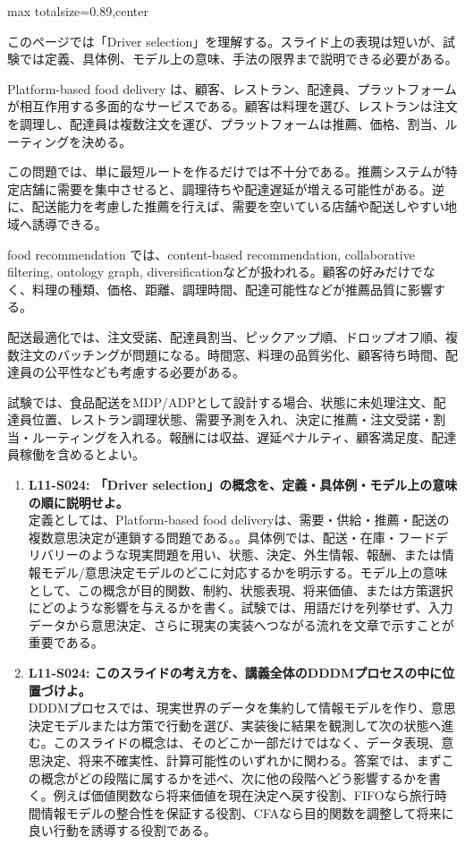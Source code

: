 \begin{minipage}[t]{0.58\textwidth}
\begin{adjustbox}{max totalsize={\textwidth}{0.89\textheight},center}
\begin{minipage}{\textwidth}\scriptsize
{}このページでは「Driver selection」を理解する。スライド上の表現は短いが、試験では定義、具体例、モデル上の意味、手法の限界まで説明できる必要がある。\par
Platform-based food delivery は、顧客、レストラン、配達員、プラットフォームが相互作用する多面的なサービスである。顧客は料理を選び、レストランは注文を調理し、配達員は複数注文を運び、プラットフォームは推薦、価格、割当、ルーティングを決める。\par
この問題では、単に最短ルートを作るだけでは不十分である。推薦システムが特定店舗に需要を集中させると、調理待ちや配達遅延が増える可能性がある。逆に、配送能力を考慮した推薦を行えば、需要を空いている店舗や配送しやすい地域へ誘導できる。\par
food recommendation では、content-based recommendation, collaborative filtering, ontology graph, diversificationなどが扱われる。顧客の好みだけでなく、料理の種類、価格、距離、調理時間、配達可能性などが推薦品質に影響する。\par
配送最適化では、注文受諾、配達員割当、ピックアップ順、ドロップオフ順、複数注文のバッチングが問題になる。時間窓、料理の品質劣化、顧客待ち時間、配達員の公平性なども考慮する必要がある。\par
試験では、食品配送をMDP/ADPとして設計する場合、状態に未処理注文、配達員位置、レストラン調理状態、需要予測を入れ、決定に推薦・注文受諾・割当・ルーティングを入れる。報酬には収益、遅延ペナルティ、顧客満足度、配達員稼働を含めるとよい。\par{}\begin{enumerate}\item \textbf{L11-S024: 「Driver selection」の概念を、定義・具体例・モデル上の意味の順に説明せよ。}\\定義としては、Platform-based food deliveryは、需要・供給・推薦・配送の複数意思決定が連鎖する問題である。。具体例では、配送・在庫・フードデリバリーのような現実問題を用い、状態、決定、外生情報、報酬、または情報モデル/意思決定モデルのどこに対応するかを明示する。モデル上の意味として、この概念が目的関数、制約、状態表現、将来価値、または方策選択にどのような影響を与えるかを書く。試験では、用語だけを列挙せず、入力データから意思決定、さらに現実の実装へつながる流れを文章で示すことが重要である。\item \textbf{L11-S024: このスライドの考え方を、講義全体のDDDMプロセスの中に位置づけよ。}\\DDDMプロセスでは、現実世界のデータを集約して情報モデルを作り、意思決定モデルまたは方策で行動を選び、実装後に結果を観測して次の状態へ進む。このスライドの概念は、そのどこか一部だけではなく、データ表現、意思決定、将来不確実性、計算可能性のいずれかに関わる。答案では、まずこの概念がどの段階に属するかを述べ、次に他の段階へどう影響するかを書く。例えば価値関数なら将来価値を現在決定へ戻す役割、FIFOなら旅行時間情報モデルの整合性を保証する役割、CFAなら目的関数を調整して将来に良い行動を誘導する役割である。\end{enumerate}

\end{minipage}
\end{adjustbox}
\end{minipage}
